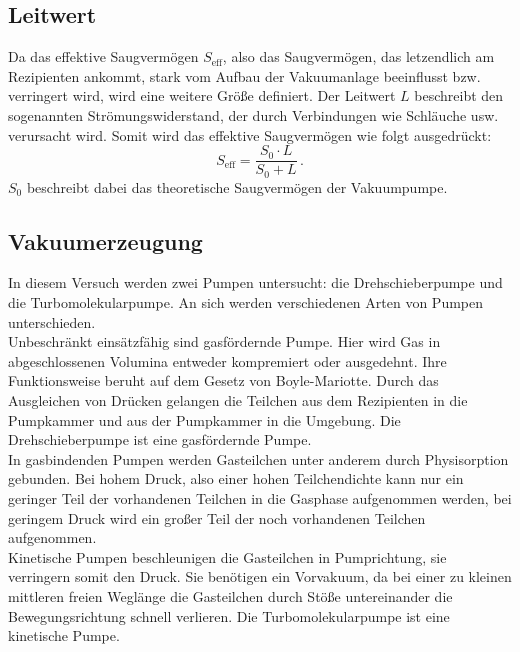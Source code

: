         \subsection{Leitwert}
        \label{subsec:leitwert}
            Da das effektive Saugvermögen $S_\text{eff}$, also das Saugvermögen, das letzendlich am Rezipienten ankommt, stark vom Aufbau der Vakuumanlage beeinflusst bzw. verringert wird, wird eine weitere Größe definiert.
            Der Leitwert $L$ beschreibt den sogenannten Strömungswiderstand, der durch Verbindungen wie Schläuche usw. verursacht wird.
            Somit wird das effektive Saugvermögen wie folgt ausgedrückt:
            \begin{equation*}
                S_\text{eff} = \frac{S_0 \cdot L}{S_0 + L} \, .
            \end{equation*}
            $S_0$ beschreibt dabei das theoretische Saugvermögen der Vakuumpumpe. \cite{Pfeiffer}


    \subsection{Vakuumerzeugung}
        In diesem Versuch werden zwei Pumpen untersucht: die Drehschieberpumpe und die Turbomolekularpumpe. An sich werden verschiedenen Arten von Pumpen unterschieden. \\
        Unbeschränkt einsätzfähig sind gasfördernde Pumpe. Hier wird Gas in abgeschlossenen Volumina entweder kompremiert oder ausgedehnt. Ihre Funktionsweise beruht auf dem Gesetz von 
        Boyle-Mariotte. Durch das Ausgleichen von Drücken gelangen die Teilchen aus dem Rezipienten in die Pumpkammer und aus der Pumpkammer in die Umgebung. Die Drehschieberpumpe ist eine 
        gasfördernde Pumpe. \\
        In gasbindenden Pumpen werden Gasteilchen unter anderem durch Physisorption gebunden. Bei hohem Druck, also einer hohen Teilchendichte kann nur ein geringer Teil der vorhandenen 
        Teilchen in die Gasphase aufgenommen werden, bei geringem Druck wird ein großer Teil der noch vorhandenen Teilchen aufgenommen. \\
        Kinetische Pumpen beschleunigen die Gasteilchen in Pumprichtung, sie verringern somit den Druck. 
        Sie benötigen ein Vorvakuum, da bei einer zu kleinen mittleren freien Weglänge die Gasteilchen durch Stöße untereinander die Bewegungsrichtung schnell verlieren. 
        Die Turbomolekularpumpe ist eine kinetische Pumpe.


